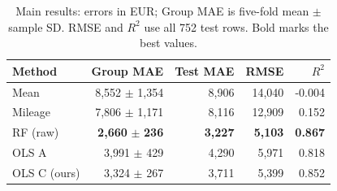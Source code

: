 \begin{table}[h!]
\centering\small\setlength{\tabcolsep}{3pt}
\begin{tabular}{lrrrr}
\toprule
Method & Group MAE & Test MAE & RMSE & $R^2$\\
\midrule
Mean & 8,552 $\pm$ 1,354 & 8,906 & 14,040 & -0.004\\
Mileage & 7,806 $\pm$ 1,171 & 8,116 & 12,909 & 0.152\\
RF (raw) & \textbf{2,660} $\pm$ \textbf{236} & \textbf{3,227} & \textbf{5,103} & \textbf{0.867}\\
OLS A & 3,991 $\pm$ 429 & 4,290 & 5,971 & 0.818\\
OLS C (ours) & 3,324 $\pm$ 267 & 3,711 & 5,399 & 0.852\\
\bottomrule
\end{tabular}
\caption{Main results: errors in EUR; Group MAE is five-fold mean $\pm$ sample SD. RMSE and $R^2$ use all 752 test rows. Bold marks the best values.}
\label{tab:results}
\end{table}
